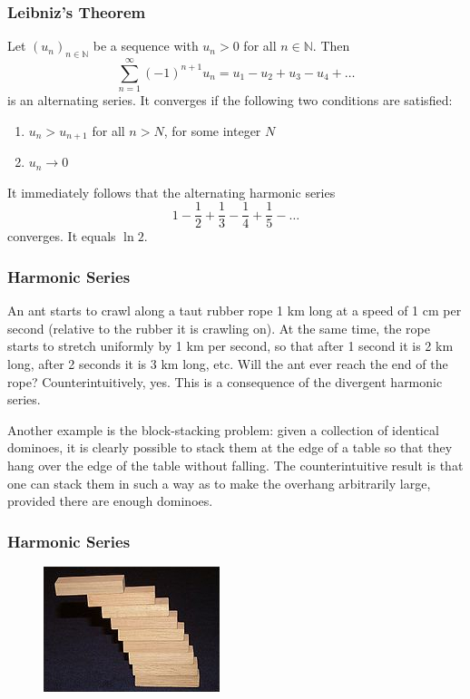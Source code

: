 \documentclass[xcolor=dvipsnames]{beamer}
\begin{document}
\begin{frame}
  \frametitle{Leibniz's Theorem}
  Let $\left(u_{n}\right)_{n\in\mathbb{N}}$ be a sequence with
  $u_{n}>0$ for all $n\in\mathbb{N}$. Then
  \begin{equation}
    \label{eq:aegeigho}
    \sum_{n=1}^{\infty}(-1)^{n+1}u_{n}=u_{1}-u_{2}+u_{3}-u_{4}+{\ldots}
  \end{equation}
is an \alert{alternating series}. It converges if the
following two conditions are satisfied:
\begin{enumerate}
\item $u_{n}>u_{n+1}$ for all $n>N$, for some integer $N$
\item $u_{n}\longrightarrow{}0$
\end{enumerate}
It immediately follows that the alternating harmonic series
\begin{equation}
  \label{eq:aighuhif}
  1-\frac{1}{2}+\frac{1}{3}-\frac{1}{4}+\frac{1}{5}-{\ldots}
\end{equation}
converges. It equals $\ln{}2$.
\end{frame}

\begin{frame}
  \frametitle{Harmonic Series}
  An ant starts to crawl along a taut rubber rope 1 km long at a
  speed of 1 cm per second (relative to the rubber it is crawling
  on). At the same time, the rope starts to stretch uniformly by 1
  km per second, so that after 1 second it is 2 km long, after 2
  seconds it is 3 km long, etc. Will the ant ever reach the end of
  the rope? Counterintuitively, yes. This is a consequence of the
  divergent harmonic series.

  \bigskip

  Another example is the block-stacking problem: given a
  collection of identical dominoes, it is clearly possible to
  stack them at the edge of a table so that they hang over the
  edge of the table without falling. The counterintuitive result
  is that one can stack them in such a way as to make the overhang
  arbitrarily large, provided there are enough dominoes.
\end{frame}

\begin{frame}
  \frametitle{Harmonic Series}
  \begin{figure}[h]
    \includegraphics[scale=.02]{./diagrams/harm1.jpg}
  \end{figure}
\end{frame}
\end{document}
